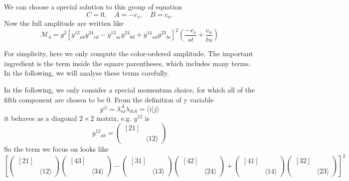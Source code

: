 \documentclass[12pt]{article}
\newcommand{\avg}[1]{\langle #1 \rangle}
\newcommand{\inner}[2]{\langle #1 | #2 \rangle}
\begin{document}
We can choose a special solution to this group of equation
\begin{equation}
    C=0,\quad A=-c_s, \quad B=c_u.
\end{equation}
Now the full amplitude are written like 
\begin{equation}
    \mathcal{M}_4=g^2\left[
y^{12}{}_{ab} y^{34}{}_{cd}
- y^{13}{}_{ac} y^{24}{}_{bd}
+ y^{14}{}_{ad} y^{23}{}_{bc}
\right]^{2}\left(\frac{-c_s}{st}+\frac{c_u}{tu}\right)
\end{equation}

For simplicity, here we only compute the color-ordered amplitude. The important ingredient is the term inside the square parentheses, which includes 
many terms. In the following, we will analyse these terms carefully.

In the following, we only consider a special momentum choice, for which all of the fifth component are chosen to be 0. From the definition of y variable
\begin{equation}
    y^{ij}=\lambda_{ia}^A\lambda_{ibA}=\inner{i}{j}
\end{equation}
it behaves as a diagonal $2\times 2$ matrix, e.g. $y^{12}$ is
\begin{equation}
    y^{12}{}_{ab}=\begin{pmatrix}
        [21] & \\
         & \avg{12}
    \end{pmatrix}
\end{equation}
So the term we focus on looks like
\begin{equation}
    \left[\begin{pmatrix}
        [21] & \\
         & \avg{12}
    \end{pmatrix}\begin{pmatrix}
        [43] & \\
         & \avg{34}
    \end{pmatrix}-\begin{pmatrix}
        [31] & \\
         & \avg{13}
    \end{pmatrix}\begin{pmatrix}
        [42] & \\
         & \avg{24}
    \end{pmatrix}+\begin{pmatrix}
        [41] & \\
         & \avg{14}
    \end{pmatrix}\begin{pmatrix}
        [32] & \\
         & \avg{23}
    \end{pmatrix}\right]^2
    \label{202}
\end{equation}
\end{document}
